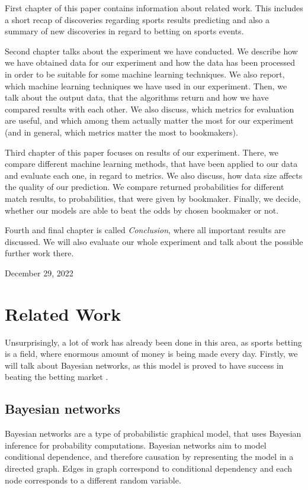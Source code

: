 \documentclass[conference]{IEEEtran}
\begin{document}
First chapter of this paper contains information about related work. This includes a 
short recap of discoveries regarding sports results predicting and also a summary of 
new discoveries in regard to betting on sports events.

Second chapter talks about the experiment we have conducted. We describe how we have obtained 
data for our experiment and how the data has been processed in order to be suitable for some 
machine learning techniques. We also report, which machine learning techniques we have used in 
our experiment. Then, we talk about the output data, that the algorithms return and how we 
have compared results with each other. We also discuss, which metrics 
for evaluation are useful, and which among them actually matter the most for our 
experiment (and in general, which metrics matter the most to bookmakers).

Third chapter of this paper focuses on results of our experiment. There, we compare 
different machine learning methods, that have been applied to our data and 
evaluate each one, in regard to metrics. We also discuss, how data size affects the quality 
of our prediction. We compare returned probabilities for different match results, 
to probabilities, that were given by bookmaker. Finally, we decide, whether our models are 
able to beat the odds by chosen bookmaker or not.

Fourth and final chapter is called \emph{Conclusion}, where all important results are
discussed. We will also evaluate our whole experiment and talk about the possible further work 
there.
 
\hfill December 29, 2022

\section{Related Work}

Unsurprisingly, a lot of work has already been done in this area, as sports betting is a field,
where enormous amount of money is being made every day. Firstly, we will talk about 
Bayesian networks, as this model is proved to have success in beating the betting market 
\cite{Constantinou_2012}.

\subsection{Bayesian networks}

Bayesian networks are a type of probabilistic graphical model, that uses Bayesian 
inference for probability computations. Bayesian networks aim to model conditional 
dependence, and therefore causation by representing the model
in a directed graph. Edges in graph correspond to conditional dependency and 
each node corresponds to a different random variable.
\end{document}
